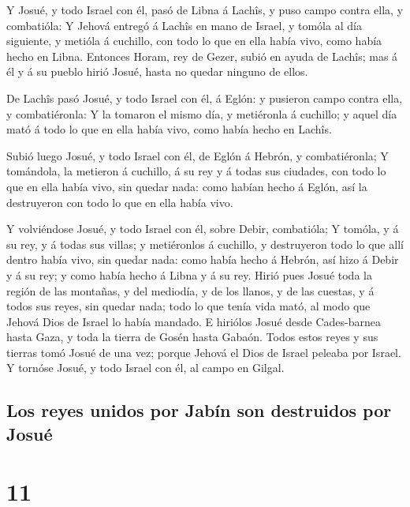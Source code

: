  Y Josué, y todo Israel con él, pasó de Libna á Lachîs, y
puso campo contra ella, y combatióla:  Y Jehová entregó á
Lachîs en mano de Israel, y tomóla al día siguiente, y metióla á
cuchillo, con todo lo que en ella había vivo, como había hecho en Libna.
 Entonces Horam, rey de Gezer, subió en ayuda de Lachîs;
mas á él y á su pueblo hirió Josué, hasta no quedar ninguno de ellos.

 De Lachîs pasó Josué, y todo Israel con él, á Eglón: y
pusieron campo contra ella, y combatiéronla:  Y la
tomaron el mismo día, y metiéronla á cuchillo; y aquel día mató á todo
lo que en ella había vivo, como había hecho en Lachîs.

 Subió luego Josué, y todo Israel con él, de Eglón á
Hebrón, y combatiéronla;  Y tomándola, la metieron á
cuchillo, á su rey y á todas sus ciudades, con todo lo que en ella había
vivo, sin quedar nada: como habían hecho á Eglón, así la destruyeron con
todo lo que en ella había vivo.

 Y volviéndose Josué, y todo Israel con él, sobre Debir,
combatióla;  Y tomóla, y á su rey, y á todas sus villas;
y metiéronlos á cuchillo, y destruyeron todo lo que allí dentro había
vivo, sin quedar nada: como había hecho á Hebrón, así hizo á Debir y á
su rey; y como había hecho á Libna y á su rey.  Hirió
pues Josué toda la región de las montañas, y del mediodía, y de los
llanos, y de las cuestas, y á todos sus reyes, sin quedar nada; todo lo
que tenía vida mató, al modo que Jehová Dios de Israel lo había mandado.
 E hiriólos Josué desde Cades-barnea hasta Gaza, y toda
la tierra de Gosén hasta Gabaón.  Todos estos reyes y sus
tierras tomó Josué de una vez; porque Jehová el Dios de Israel peleaba
por Israel.  Y tornóse Josué, y todo Israel con él, al
campo en Gilgal.

\hypertarget{los-reyes-unidos-por-jabuxedn-son-destruidos-por-josuuxe9}{%
\subsection{Los reyes unidos por Jabín son destruidos por
Josué}\label{los-reyes-unidos-por-jabuxedn-son-destruidos-por-josuuxe9}}

\hypertarget{section-06-11}{%
\section{11}\label{section-06-11}}


